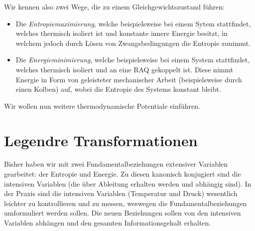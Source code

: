Wir kennen also zwei Wege, die zu einem Gleichgewichtszustand führen: 
\begin{itemize}
    \item Die \emph{Entropiemaximierung}, welche beispielsweise bei einem Sytem stattfindet, welches thermisch isoliert ist und konstante innere Energie besitzt, in welchem jedoch durch Lösen von Zwangsbedingungen die Entropie zunimmt.
    \item Die \emph{Energieminimierung}, welche beispielsweise bei einem System stattfindet, welches thermisch isoliert und an eine RAQ gekoppelt ist. Diese nimmt Energie in Form von geleisteter mechanischer Arbeit (beispielsweise durch einen Kolben) auf, wobei die Entropie des Systems konstant bleibt.
\end{itemize}
Wir wollen nun weitere thermodynamische Potentiale einführen.

\section*{Legendre Transformationen}
Bisher haben wir mit zwei Fundamentalbeziehungen extensiver Variablen gearbeitet: der Entropie und Energie. Zu diesen kanonisch konjugiert sind die intensiven Variablen (die über Ableitung erhalten werden und abhängig sind).
In der Praxis sind die intensiven Variablen (Temperatur und Druck) wesentlich leichter zu kontrollieren und zu messen, weswegen die Fundamentalbeziehungen umformuliert werden sollen. Die neuen Beziehungen sollen von den intensiven Variablen abhängen und den gesamten Informationsgehalt erhalten. 

